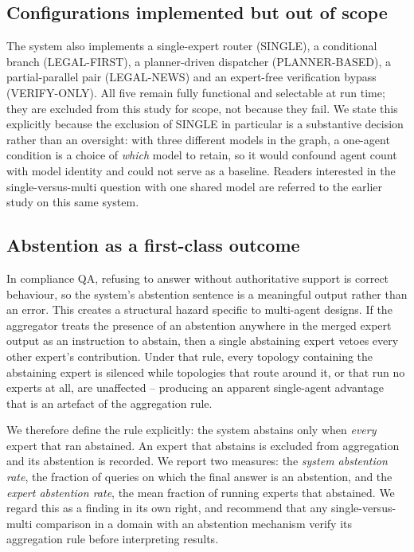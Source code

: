 \documentclass[journal,10pt,compsoc,onecolumn]{IEEEtran}
\begin{document}
\subsection{Configurations implemented but out of scope}
\label{sec:scope}
The system also implements a single-expert router (SINGLE), a conditional branch
(LEGAL-FIRST), a planner-driven dispatcher (PLANNER-BASED), a partial-parallel
pair (LEGAL-NEWS) and an expert-free verification bypass (VERIFY-ONLY). All five
remain fully functional and selectable at run time; they are excluded from this
study for scope, not because they fail. We state this explicitly because the
exclusion of SINGLE in particular is a substantive decision rather than an
oversight: with three different models in the graph, a one-agent condition is a
choice of \emph{which} model to retain, so it would confound agent count with
model identity and could not serve as a baseline. Readers interested in the
single-versus-multi question with one shared model are referred to the earlier
study on this same system.

\subsection{Abstention as a first-class outcome}
\label{sec:abstention}
In compliance QA, refusing to answer without authoritative support is correct
behaviour, so the system's abstention sentence is a meaningful output rather than
an error. This creates a structural hazard specific to multi-agent designs. If
the aggregator treats the presence of an abstention anywhere in the merged expert
output as an instruction to abstain, then a single abstaining expert vetoes every
other expert's contribution. Under that rule, every topology containing the
abstaining expert is silenced while topologies that route around it, or that run
no experts at all, are unaffected -- producing an apparent single-agent advantage
that is an artefact of the aggregation rule.

We therefore define the rule explicitly: the system abstains only when
\emph{every} expert that ran abstained. An expert that abstains is excluded from
aggregation and its abstention is recorded. We report two measures: the
\emph{system abstention rate}, the fraction of queries on which the final answer
is an abstention, and the \emph{expert abstention rate}, the mean fraction of
running experts that abstained. We regard this as a finding in its own right, and
recommend that any single-versus-multi comparison in a domain with an abstention
mechanism verify its aggregation rule before interpreting results.
\end{document}
